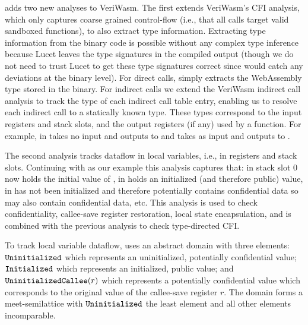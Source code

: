 %
\verifname{} adds two new analyses to VeriWasm.
%
The first extends VeriWasm's CFI analysis, which only captures coarse
grained control-flow (i.e., that all calls target valid sandboxed functions),
to also extract type information.
%
Extracting type information from the binary code is possible without any complex
type inference because Lucet leaves the type signatures in the compiled output
(though we do not need to trust Lucet to get these type signatures correct 
since \verifname{} would catch any deviations at the binary level).
%
For direct calls, \verifname{} simply extracts the WebAssembly type stored in the
binary.
%
For indirect calls we extend the VeriWasm indirect call analysis to track the
type of each indirect call table entry, enabling us to resolve each indirect call to a
statically known type.
%
These types correspond to the input registers and stack slots, and the output registers
(if any) used by a function.
%
For example, in   takes no input
and outputs to  and  takes 
as input and outputs to .

The second analysis tracks dataflow in local variables, i.e., in registers and stack slots.
%
Continuing with  as our example this analysis captures that:
in  stack slot 0 now holds the initial value
of , in  
holds an initialized (and therefore public) value, in
  has not been
initialized and therefore potentially contains confidential data so
 may also contain confidential data, etc.
%
This analysis is used to check confidentiality, callee-save register
restoration, local state encapsulation, and is combined with the previous
analysis to check type-directed CFI.

%
To track local variable dataflow, \verifname{} uses an abstract domain with
three elements: $\mathtt{Uninitialized}$ which represents an uninitialized, potentially
confidential value; $\mathtt{Initialized}$ which represents an initialized, public value; and
$\mathtt{UninitializedCallee}({r})$ which represents a potentially confidential value which
corresponds to the original value of the callee-save register $r$.
%
The domain forms a meet-semilattice with $\mathtt{Uninitialized}$ the least element and all
other elements incomparable.

